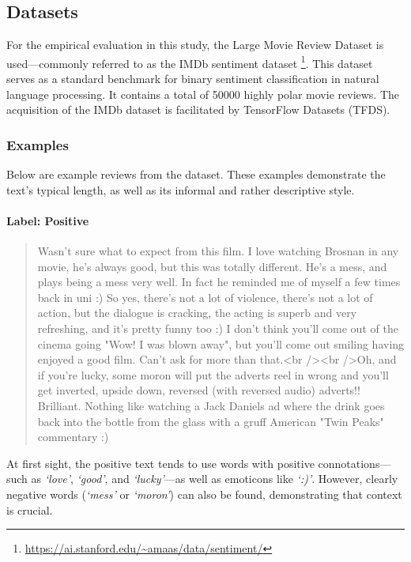 \documentclass[a4paper,fleqn]{cas-dc}
\newcommand{\literal}[1]{\textit{`#1'}}
\begin{document}
\subsection{Datasets}

For the empirical evaluation in this study, the Large Movie Review Dataset is used---commonly referred to as the IMDb sentiment dataset \cite{Maas2011imdb}\footnote{\url{https://ai.stanford.edu/~amaas/data/sentiment/}}. This dataset serves as a standard benchmark for binary sentiment classification in natural language processing. It contains a total of \num{50000} highly polar movie reviews. The acquisition of the IMDb dataset is facilitated by TensorFlow Datasets (TFDS).

\subsubsection{Examples}

Below are example reviews from the dataset. These examples demonstrate the text's typical length, as well as its informal and rather descriptive style.

\paragraph{Label: Positive}

\begin{quote}	
	Wasn't sure what to expect from this film. I love watching Brosnan in any movie, he's always good, but this was totally different. He's a mess, and plays being a mess very well. In fact he reminded me of myself a few times back in uni :) So yes, there's not a lot of violence, there's not a lot of action, but the dialogue is cracking, the acting is superb and very refreshing, and it's pretty funny too :) I don't think you'll come out of the cinema going "Wow! I was blown away", but you'll come out smiling having enjoyed a good film. Can't ask for more than that.<br /><br />Oh, and if you're lucky, some moron will put the adverts reel in wrong and you'll get inverted, upside down, reversed (with reversed audio) adverts!! Brilliant. Nothing like watching a Jack Daniels ad where the drink goes back into the bottle from the glass with a gruff American "Twin Peaks" commentary :)
\end{quote}

At first sight, the positive text tends to use words with positive connotations---such as \literal{love}, \literal{good}, and \literal{lucky}---as well as emoticons like \literal{:)}. However, clearly negative words (\literal{mess} or \literal{moron}) can also be found, demonstrating that context is crucial.
\end{document}
